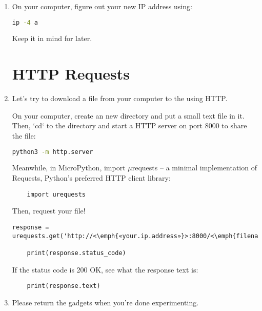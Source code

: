 \documentclass{../tutorial}
\begin{document}
\begin{enumerate}
\item
    On your computer, figure out your new IP address using:

    \begin{lstlisting}[language=bash]
    ip -4 a
    \end{lstlisting}

    Keep it in mind for later.

\section{HTTP Requests}

\item
    Let's try to download a file from your computer to the 
    using HTTP.

    On your computer, create an new directory and put a small text file in it.
    Then, `cd` to the directory and start a HTTP server on port 8000
    to share the file:

    \begin{lstlisting}[language=bash]
    python3 -m http.server
    \end{lstlisting}

    Meanwhile, in MicroPython, import $\mu$requests – a minimal
    implementation of Requests, Python's preferred HTTP client library:

    \begin{lstlisting}
    import urequests
    \end{lstlisting}

    Then, request your file!

    \begin{lstlisting}[escapeinside=<>]
    response = urequests.get('http://<\emph{«your.ip.address»}>:8000/<\emph{filename.txt}>')

    print(response.status_code)
    \end{lstlisting}

    If the status code is 200 OK, see what the response text is:

    \begin{lstlisting}
    print(response.text)
    \end{lstlisting}

\item
    Please return the gadgets when you're done experimenting.

\end{enumerate}
\end{document}

